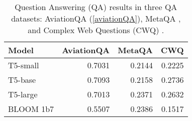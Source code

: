 \documentclass[11pt]{article}
\begin{document}
\begin{table}[!]
  \begin{center}
    \begin{tabular}{lrrr} 
    \hline
      \textbf{Model} & \textbf{AviationQA} & \textbf{MetaQA} & \textbf{CWQ}\\
      \hline
      T5-small & 0.7031 & 0.2144 & 0.2225\\
      T5-base & 0.7093 & 0.2158 & 0.2736\\
      T5-large & 0.7013 & 0.2371 & 0.2632 \\
       BLOOM 1b7 & 0.5507 & 0.2386 & 0.1517 \\
      \hline
    \end{tabular}
        \caption{Question Answering (QA) results in three QA datasets: AviationQA (\ref{aviationQA}), MetaQA \cite{zhang2018variational}, and Complex Web Questions (CWQ) \cite{talmor2018web}.}
    \label{tab:QA}
  \end{center}
\end{table}
\end{document}
